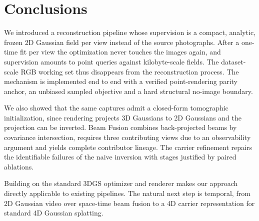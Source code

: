 \section{Conclusions}
\label{sec:conclusion}

We introduced a reconstruction pipeline whose supervision is a compact, analytic, frozen
2D Gaussian field per view instead of the source photographs.  After a one-time fit per
view the optimization never touches the images again, and supervision amounts to point
queries against kilobyte-scale fields.  The dataset-scale RGB working set thus disappears
from the reconstruction process.  The mechanism is implemented end to end with a verified
point-rendering parity anchor, an unbiased sampled objective and a hard structural
no-image boundary.  

We also showed that the same captures admit a closed-form tomographic initialization,
since rendering projects 3D Gaussians to 2D Gaussians and the projection can be inverted.
Beam Fusion combines back-projected beams by covariance intersection, requires three
contributing views due to an observability argument and yields complete contributor
lineage.  The carrier refinement repairs the identifiable failures of the naive inversion
with stages justified by paired ablations.  

Building on the standard 3DGS optimizer and renderer makes our approach directly
applicable to existing pipelines.  The natural next step is temporal, from 2D Gaussian
video over space-time beam fusion to a 4D carrier representation for standard 4D Gaussian
splatting.
